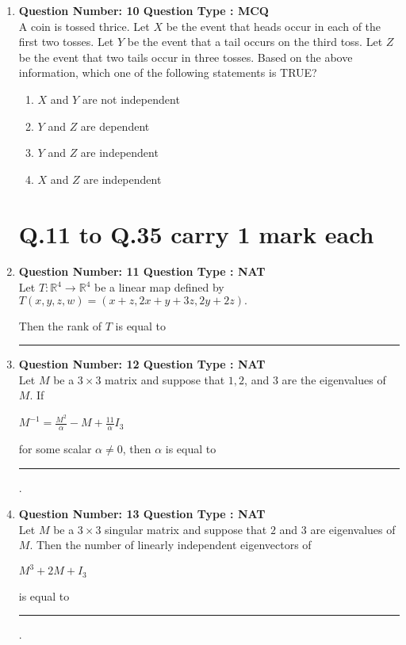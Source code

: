 \documentclass[journal]{IEEEtran}
\numberwithin{equation}{enumi}
\numberwithin{figure}{enumi}
\begin{document}
\begin{enumerate}
\begin{enumerate}
\end{enumerate}
\bigskip
\item \textbf{Question Number: 10 Question Type : MCQ}\\
A coin is tossed thrice. Let $ X $ be the event that heads occur in each of the first two tosses. Let $ Y $ be the event that a tail occurs on the third toss. Let $ Z $ be the event that two tails occur in three tosses. Based on the above information, which one of the following statements is TRUE? \\

\begin{enumerate}
    \item $ X $ and $ Y $ are not independent
    \item $ Y $ and $ Z $ are dependent
    \item $ Y $ and $ Z $ are independent
    \item $ X $ and $ Z $ are independent
\end{enumerate}
\bigskip
\section*{Q.11 to Q.35 carry 1 mark each}
\item \textbf{Question Number: 11 Question Type : NAT}\\
Let $ T : \mathbb{R}^4 \to \mathbb{R}^4 $ be a linear map defined by \\

$T(x, y, z, w) = (x + z, 2x + y + 3z, 2y + 2z).$

Then the rank of $ T $ is equal to \rule{1cm}{0.15mm}
\bigskip
\item \textbf{Question Number: 12 Question Type : NAT}\\
Let $ M $ be a $ 3 \times 3 $ matrix and suppose that $ 1, 2 $, and $ 3 $ are the eigenvalues of $ M $. If 

$M^{-1} = \frac{M^2}{\alpha} - M + \frac{11}{\alpha} I_3$

for some scalar $ \alpha \neq 0 $, then $ \alpha $ is equal to \rule{1cm}{0.15mm}.
\bigskip
\item \textbf{Question Number: 13 Question Type : NAT}\\
Let $ M $ be a $ 3 \times 3 $ singular matrix and suppose that $ 2 $ and $ 3 $ are eigenvalues of $ M $. Then the number of linearly independent eigenvectors of 

$M^3 + 2M + I_3$

is equal to \rule{1cm}{0.15mm}.
\end{enumerate}
\end{document}
